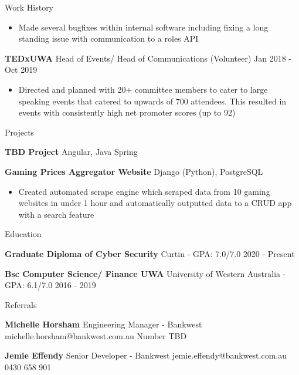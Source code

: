 \documentclass{resume} %
\begin{document}
\begin{rSection}{Work History}
\begin{itemize}
			\item Made several bugfixes within internal software including fixing a long standing issue with communication to a roles API
		\end{itemize}
		\item \textbf{TEDxUWA} {Head of Events/ Head of Communications} (Volunteer) \hfill Jan 2018 - Oct 2019
		\begin{itemize} 
			\item Directed and planned with 20+ committee members to cater to large speaking events that catered to upwards of 700 attendees. This resulted in events with consistently high net promoter scores (up to 92)  
		\end{itemize}
	\end{rSection} 
	
	\begin{rSection}{Projects}
		\vspace{-1.25em}
		\item \textbf{TBD Project} {Angular, Java Spring}
		\item \textbf{Gaming Prices Aggregator Website} {Django (Python), PostgreSQL} 
		\begin{itemize} 
			\item Created automated scrape engine which scraped data from 10 gaming websites in under 1 hour and automatically outputted data to a CRUD app with a search feature
		\end{itemize}
	\end{rSection} 
	
	\begin{rSection}{Education}
		\vspace{-1.25em}
		\item \textbf{Graduate Diploma of Cyber Security} {Curtin} - GPA: 7.0/7.0 \hfill 2020 - Present
		\item \textbf{Bsc Computer Science/ Finance UWA} {University of Western Australia} - GPA: 6.1/7.0 \hfill 2016 - 2019
	\end{rSection} 
	
	\begin{rSection}{Referrals} 
		\vspace{-1.25em}
		\item \textbf{Michelle Horsham} {Engineering Manager - Bankwest} 
			\hfill
			 michelle.horsham@bankwest.com.au
			 Number TBD
		
		\item \textbf{Jemie Effendy} {Senior Developer - Bankwest} 
			\hfill 
			 jemie.effendy@bankwest.com.au
			 0430 658 901
	\end{rSection}
\end{document}
